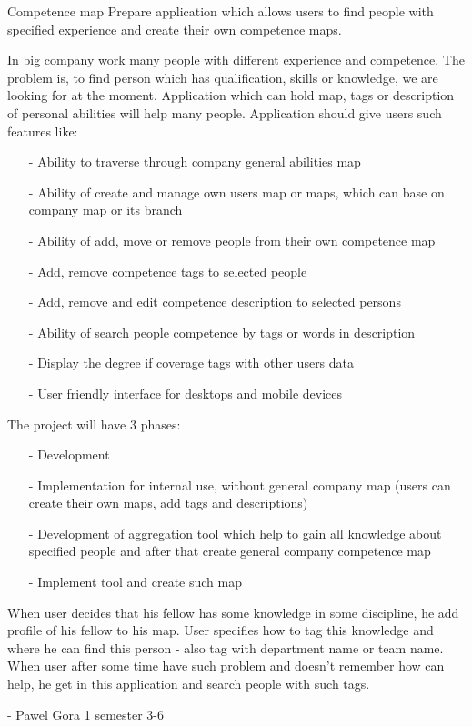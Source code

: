 \begin{project}
{Competence map}
{Prepare application which allows users to find people with specified experience and create their own competence maps.} 
{
In big company work many people with different experience and competence. The problem is, to find person which has qualification, skills or knowledge, we are looking for at the moment.
Application which can hold map, tags or description of personal abilities will help many people. 
Application should give users such features like:
\begin{itemize}
	\item[-] Ability to traverse through company general abilities map
	\item[-] Ability of create and manage own users map or maps, which can base on company map or its branch
	\item[-] Ability of add, move or remove people from their own competence map
	\item[-] Add, remove competence tags to selected people
	\item[-] Add, remove and edit competence description to selected persons
	\item[-] Ability of search people competence by tags or words in description
	\item[-] Display  the degree if coverage tags with other users data 
	\item[-] User friendly interface for desktops and mobile devices
\end{itemize}
The project will have 3 phases:
\begin{itemize}
	\item[-] Development
	\item[-] Implementation for internal use, without general company map (users can create their own maps, add tags and descriptions)
	\item[-] Development of aggregation tool which help to gain all knowledge about specified people and after that create general company competence map
	\item[-] Implement tool and create such map
\end{itemize}
When user decides that his fellow has some knowledge in some discipline, he add profile of his fellow to his map. User specifies how to tag this knowledge and where he can find this person - also tag with department name or team name.
When user after some time have such problem and doesn't remember how can help, he get in this application and search people with such tags.
}
{-}
{Pawel Gora}
{1 semester}
{3-6}
\end{project}
